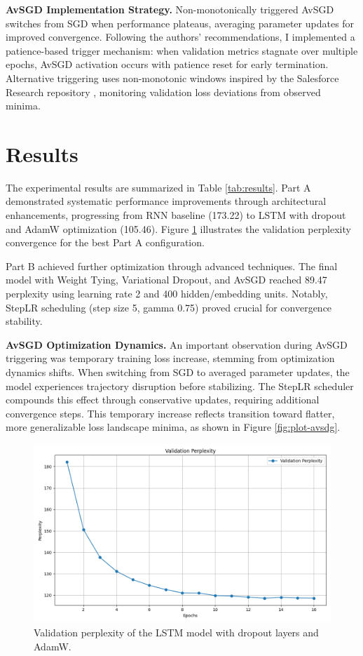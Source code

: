 \documentclass[a4paper]{article}
\begin{document}
\textbf{AvSGD Implementation Strategy.} Non-monotonically triggered AvSGD switches from SGD when performance plateaus, averaging parameter updates for improved convergence. Following the authors' recommendations, I implemented a patience-based trigger mechanism: when validation metrics stagnate over multiple epochs, AvSGD activation occurs with patience reset for early termination. Alternative triggering uses non-monotonic windows inspired by the Salesforce Research repository \cite{salesforce-repo}, monitoring validation loss deviations from observed minima.

\section{Results}
The experimental results are summarized in Table \ref{tab:results}. Part A demonstrated systematic performance improvements through architectural enhancements, progressing from RNN baseline (173.22) to LSTM with dropout and AdamW optimization (105.46). Figure \ref{fig:plot} illustrates the validation perplexity convergence for the best Part A configuration.

Part B achieved further optimization through advanced techniques. The final model with Weight Tying, Variational Dropout, and AvSGD reached 89.47 perplexity using learning rate 2 and 400 hidden/embedding units. Notably, StepLR scheduling (step size 5, gamma 0.75) proved crucial for convergence stability.

\textbf{AvSGD Optimization Dynamics.} An important observation during AvSGD triggering was temporary training loss increase, stemming from optimization dynamics shifts. When switching from SGD to averaged parameter updates, the model experiences trajectory disruption before stabilizing. The StepLR scheduler compounds this effect through conservative updates, requiring additional convergence steps. This temporary increase reflects transition toward flatter, more generalizable loss landscape minima, as shown in Figure \ref{fig:plot-avsdg}.

\begin{figure}[h!]
\centering
\includegraphics[width=0.8\linewidth]{images/part_A.png}
\caption{Validation perplexity of the LSTM model with dropout layers and AdamW.}
\label{fig:plot}
\end{figure}
\end{document}
